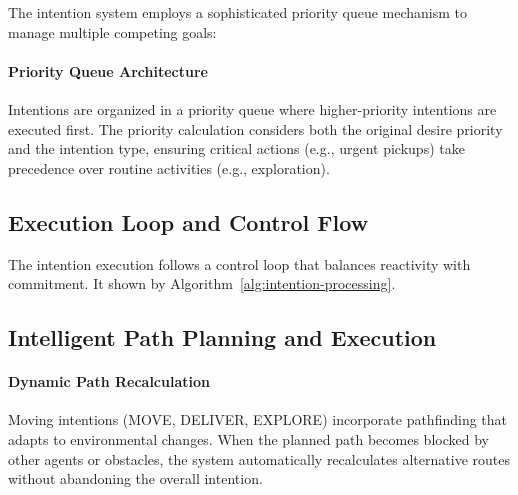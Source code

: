 The intention system employs a sophisticated priority queue mechanism to manage multiple competing goals:

\paragraph{Priority Queue Architecture}
Intentions are organized in a priority queue where higher-priority intentions are executed first. The priority calculation considers both the original desire priority and the intention type, ensuring critical actions (e.g., urgent pickups) take precedence over routine activities (e.g., exploration).

\subsection{Execution Loop and Control Flow}

The intention execution follows a control loop that balances reactivity with commitment. It shown by Algorithm~\ref{alg:intention-processing}.

\begin{algorithm}[htbp!]
	\DontPrintSemicolon
	\label{alg:intention-processing}
	\caption{Enhanced Intention Processing Loop}
\end{algorithm}

\subsection{Intelligent Path Planning and Execution}

\paragraph{Dynamic Path Recalculation}
Moving intentions (MOVE, DELIVER, EXPLORE) incorporate pathfinding that adapts to environmental changes. When the planned path becomes blocked by other agents or obstacles, the system automatically recalculates alternative routes without abandoning the overall intention.

